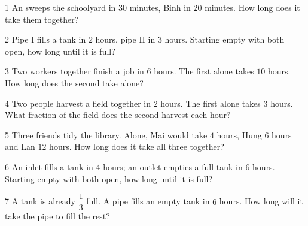 \begin{probbox}{1}{\relax}
An sweeps the schoolyard in $30$ minutes, Binh in $20$ minutes. How long does it take them together?
\end{probbox}
\gap
\begin{probbox}{2}{\relax}
Pipe I fills a tank in $2$ hours, pipe II in $3$ hours. Starting empty with both open, how long until it is full?
\end{probbox}
\gap
\begin{probbox}{3}{\relax}
Two workers together finish a job in $6$ hours. The first alone takes $10$ hours. How long does the second take alone?
\end{probbox}
\gap
\begin{probbox}{4}{\relax}
Two people harvest a field together in $2$ hours. The first alone takes $3$ hours. What fraction of the field does the second harvest each hour?
\end{probbox}
\gap
\begin{probbox}{5}{\relax}
Three friends tidy the library. Alone, Mai would take $4$ hours, Hung $6$ hours and Lan $12$ hours. How long does it take all three together?
\end{probbox}
\gap
\begin{probbox}{6}{\relax}
An inlet fills a tank in $4$ hours; an outlet empties a full tank in $6$ hours. Starting empty with both open, how long until it is full?
\end{probbox}
\gap
\begin{probbox}{7}{\relax}
A tank is already $\dfrac13$ full. A pipe fills an empty tank in $6$ hours. How long will it take the pipe to fill the rest?
\end{probbox}
